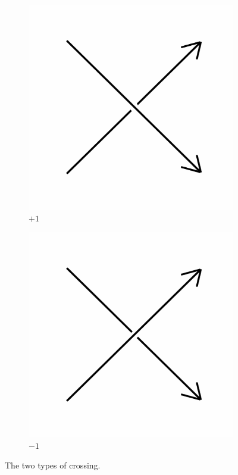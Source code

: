 \documentclass[12pt,letterpaper]{article}
\theoremstyle{definition}
\begin{document}
\begin{figure}[h]
    \centering
    \begin{subfigure}{.3\textwidth}
        \centering
        \includegraphics[width=\textwidth]{knotpics/poscross.png}
        \caption{$+1$}
    \end{subfigure}
    \hspace{1cm}
    \begin{subfigure}{.3\textwidth}
        \centering         
        \includegraphics[width=\textwidth]{knotpics/negcross.png}
        \caption{$-1$}
    \end{subfigure}
    \caption{The two types of crossing.}
\end{figure}
\end{document}
